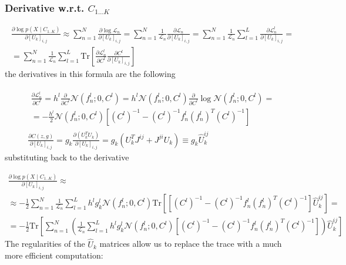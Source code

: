 \documentclass{paper}
\begin{document}
\subsubsection{Derivative w.r.t. $C_{1\dots K}$}

\begin{equation}
\begin{split}
\frac{\partial \log p(X \mid C_{1..K})}{\partial \left[ U_k \right]_{i,j}} \approx \sum_{n=1}^N \frac{\partial \log \mathcal{L}_n}{\partial \left[ U_k \right]_{i,j}} = \sum_{n=1}^N \frac{1}{\mathcal{L}_n} \frac{\partial \mathcal{L}_n}{\partial \left[ U_k \right]_{i,j}} = \sum_{n=1}^N \frac{1}{\mathcal{L}_n}  \sum_{l=1}^{L} \frac{\partial \mathcal{L}_n^l}{\partial \left[ U_k \right]_{i,j}} = \\
=  \sum_{n=1}^N \frac{1}{\mathcal{L}_n}  \sum_{l=1}^{L} \textrm{Tr} \left[ \frac{\partial \mathcal{L}_n^l}{\partial C^l} \frac{\partial C^l}{\partial \left[ U_k \right]_{i,j}} \right]
\end{split}
\end{equation}
% 
the derivatives in this formula are the following

\begin{eqnarray}
\begin{split}
\frac{\partial \mathcal{L}_n^l}{\partial C^l} = h^l \frac{\partial}{\partial C^l} \mathcal{N}(f_n^l;0,C^l) = h^l \mathcal{N}(f_n^l;0,C^l) \frac{\partial}{\partial C^l} \log \mathcal{N}(f_n^l;0,C^l) = \\
= -\frac{h^l}{2} \mathcal{N}(f_n^l;0,C^l) \left[ (C^l)^{-1} - (C^l)^{-1} f_n^l (f_n^l)^T (C^l)^{-1} \right]
\end{split} \\
\frac{\partial C(z,g)}{\partial \left[ U_k \right]_{i,j}} = g_k \frac{\partial \left( U_k^T U_k \right)}{\partial \left[ U_k \right]_{i,j}} = g_k \left( U_k^T J^{ij} + J^{ji} U_k \right) \equiv g_k \hat U_k^{ij}
\end{eqnarray}
%
substituting back to the derivative

\begin{equation}
\begin{split}
\frac{\partial \log p(X \mid C_{1..K})}{\partial \left[ U_k \right]_{i,j}} \approx \\
\approx  -\frac{1}{2} \sum_{n=1}^N \frac{1}{\mathcal{L}_n}  \sum_{l=1}^{L} h^l g^l_k \mathcal{N}(f_n^l;0,C^l)  \textrm{Tr} \left[ \left[ (C^l)^{-1} - (C^l)^{-1} f_n^l (f_n^l)^T (C^l)^{-1} \right] \hat U_k^{ij} \right] = \\
= -\frac{1}{2} \textrm{Tr} \left[ \sum_{n=1}^N \left(\frac{1}{\mathcal{L}_n}  \sum_{l=1}^{L} h^l g^l_k \mathcal{N}(f_n^l;0,C^l)   \left[ (C^l)^{-1} - (C^l)^{-1} f_n^l (f_n^l)^T (C^l)^{-1} \right] \right) \hat U_k^{ij} \right]
\end{split}
\end{equation}
%
The regularities of the $\hat U_k$ matrices allow us to replace the trace with a much more efficient computation:
\end{document}
